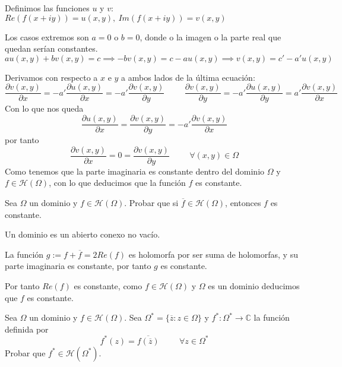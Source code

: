 \begin{sol}

Definimos las funciones $u$ y $v$: 
$Re(f(x+iy)) = u(x,y), \ Im(f(x+iy)) = v(x,y)$

Los casos extremos son $a=0$ o $b=0$, donde o la imagen o la parte real que quedan serían constantes.
$au(x,y)+bv(x,y)=c \implies -bv(x,y) = c-au(x,y) \implies v(x,y)= c'-a'u(x,y)$

Derivamos con respecto a $x$ e $y$ a ambos lados de la última ecuación:
$$\frac{\partial v(x,y)}{\partial x} = -a' \frac{\partial u(x,y)}{\partial x} = -a' \frac{\partial v(x,y)}{\partial y} \hspace{1cm} \frac{\partial v(x,y)}{\partial y} = -a' \frac{\partial u(x,y)}{\partial y} = a' \frac{\partial v(x,y)}{\partial x}$$
Con lo que nos queda
$$\frac{\partial u (x,y)}{\partial x} = \frac{\partial v(x,y)}{\partial y} = -a'\frac{\partial v(x,y)}{\partial x}$$
por tanto
$$\frac{\partial v(x,y)}{\partial x} = 0 = \frac{\partial v(x,y)}{\partial y} \hspace{1cm}\forall (x,y)\in\Omega$$
Como tenemos que la parte imaginaria es constante dentro del dominio $\Omega$ y $f\in\mathcal{H}(\Omega)$, con lo que deducimos que la función $f$ es constante.
\end{sol}



\begin{ejer}
	Sea $\Omega$ un dominio y $f\in\mathcal{H}(\Omega)$. Probar que si $\overline{f}\in\mathcal{H}(\Omega)$, entonces $f$ es constante.
\end{ejer}


\begin{sol}
	
Un dominio es un abierto conexo no vacío.

La función $g := f+\overline{f} = 2Re(f)$ es holomorfa por ser suma de holomorfas, y su parte imaginaria es constante, por tanto $g$ es constante.

Por tanto $Re(f)$ es constante, como $f\in\mathcal{H}(\Omega)$ y $ \Omega$ es un dominio deducimos que $f$ es constante.
\end{sol}





\begin{ejer}
	Sea $\Omega$ un dominio y $f\in\mathcal{H}(\Omega)$. Sea $\Omega^{\ast} = \{ \overline{z} : z\in\Omega \}$ y $f^{\ast}:\Omega^{\ast} \rightarrow \mathbb{C}$ la función definida por
	$$ f^{\ast}(z) = \overline{ f(\overline{z} ) } \hspace{1cm} \forall z\in\Omega^{\ast}$$
	Probar que $f^{\ast}\in\mathcal{H}(\Omega^{\ast})$.
\end{ejer}

